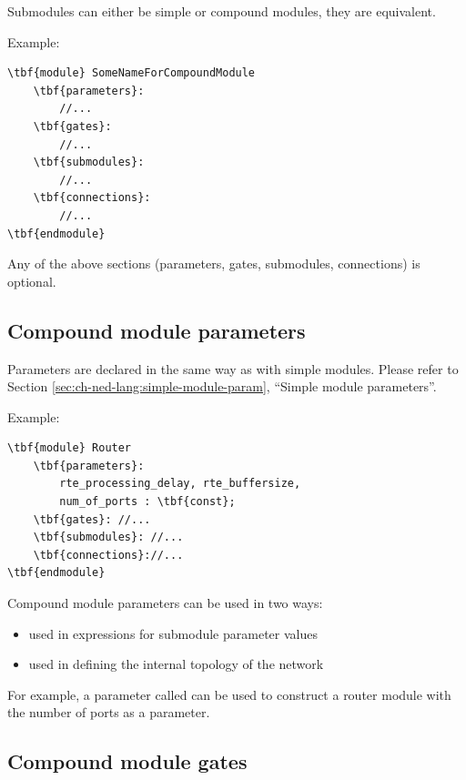 Submodules can either be simple or
compound modules, they are equivalent.


Example:

\begin{Verbatim}[commandchars=\\\{\}]
\tbf{module} SomeNameForCompoundModule
    \tbf{parameters}:
        //...
    \tbf{gates}:
        //...
    \tbf{submodules}:
        //...
    \tbf{connections}:
        //...
\tbf{endmodule}
\end{Verbatim}

Any of the above sections (parameters, gates, submodules, connections)
is optional.





\subsection{Compound module parameters}


Parameters are declared in the same
way as with simple modules.  Please refer to
Section \ref{sec:ch-ned-lang:simple-module-param}, ``Simple module
parameters''.


Example:

\begin{Verbatim}[commandchars=\\\{\}]
\tbf{module} Router
    \tbf{parameters}:
        rte_processing_delay, rte_buffersize,
        num_of_ports : \tbf{const};
    \tbf{gates}: //...
    \tbf{submodules}: //...
    \tbf{connections}://...
\tbf{endmodule}
\end{Verbatim}

Compound module parameters can be used in two ways:
\begin{itemize}
\item{used in expressions for submodule parameter values}
\item{used in defining the internal topology of the network}
\end{itemize}

For example, a parameter called  can be used to
construct a router module with the number of ports as a parameter.





\subsection{Compound module gates}


